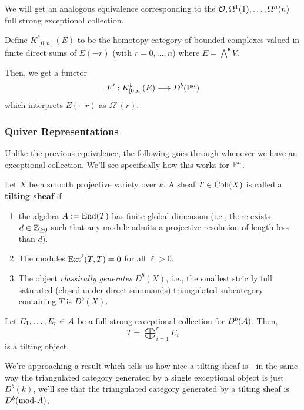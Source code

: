 \documentclass[12pt]{article}
\begin{document}
\begin{rmk}
    We will get an analogous equivalence corresponding to the $\cO,\Omega^1(1),\dots,\Omega^n(n)$ full strong exceptional collection.
    
    Define $K_{[0,n]}^b(E)$ to be the homotopy category of bounded complexes valued in finite direct sums of $E(-r)$ (with $r=0,\dots,n$) where $E=\bigwedge^\bullet V$.

    Then, we get a functor
    \[F': K_{[0,n]}^b(E) \longrightarrow D^b(\P^n)\]
    which interprets $E(-r)$ as $\Omega^r(r)$.
\end{rmk}

\subsubsection{Quiver Representations}

Unlike the previous equivalence, the following goes through whenever we have an exceptional collection. We'll see specifically how this works for $\P^n$.

\begin{defn}
    Let $X$ be a smooth projective variety over $k$. A sheaf $T\in \Coh(X)$ is called a \textbf{tilting sheaf} if
    \begin{enumerate}
        \item[(T1)] the algebra $A\defeq \End(T)$ has finite global dimension (i.e., there exists $d\in \Z_{\geq 0}$ such that any module admits a projective resolution of length less than $d$).
        \item[(T2)] The modules $\Ext^\ell(T,T)=0$ for all $\ell>0$.
        \item[(T3)] The object \textit{classically generates} $D^b(X)$, i.e., the smallest strictly full saturated (closed under direct summands) triangulated subcategory containing $T$ is $D^b(X)$.
    \end{enumerate}
\end{defn}

\begin{prop}
    Let $E_1,\dots,E_r \in \cA$ be a full strong exceptional collection for $D^b(\cA)$. Then,
    \[T = \bigoplus_{i=1}^r E_i\]
    is a tilting object.
\end{prop}

We're approaching a result which tells us how nice a tilting sheaf is---in the same way the triangulated category generated by a single exceptional object is just $D^b(k)$, we'll see that the triangulated category generated by a tilting sheaf is $D^b(\rmod A)$.
\end{document}
